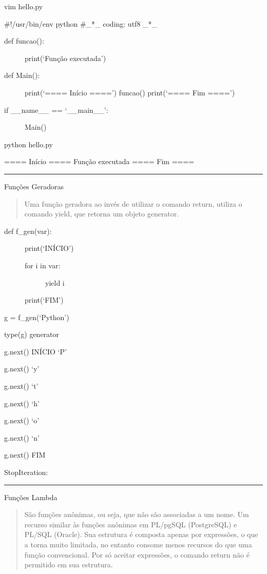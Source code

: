 \documentclass[letterpaper,10pt,brazil]{sphinxmanual}
\begin{document}
vim hello.py

\#!/usr/bin/env python
\#\_*\_ coding: utf\sphinxhyphen{}8 \_*\_
\begin{description}
\item[{def funcao():}] \leavevmode
print(‘Função executada’)

\item[{def Main():}] \leavevmode
print(‘==== Início ====’)
funcao()
print(‘==== Fim ====’)

\item[{if \_\_name\_\_ == ‘\_\_main\_\_’:}] \leavevmode
Main()

\end{description}

python hello.py

==== Início ====
Função executada
==== Fim ====


\bigskip\hrule\bigskip


Funções Geradoras
\begin{quote}

Uma função geradora ao invés de utilizar o comando return, utiliza o comando yield, que retorna um objeto generator.
\end{quote}
\begin{description}
\item[{def f\_gen(var):}] \leavevmode
print(‘INÍCIO’)
\begin{description}
\item[{for i in var:}] \leavevmode
yield i

\end{description}

print(‘FIM’)

\end{description}

g = f\_gen(‘Python’)

type(g)
generator

g.next()
INÍCIO
‘P’

g.next()
‘y’

g.next()
‘t’

g.next()
‘h’

g.next()
‘o’

g.next()
‘n’

g.next()
FIM

StopIteration:


\bigskip\hrule\bigskip


Funções Lambda
\begin{quote}

São funções anônimas, ou seja, que não são associadas a um nome. Um recurso similar às funções anônimas em PL/pgSQL (PostgreSQL) e PL/SQL (Oracle).
Sua estrutura é composta apenas por expressões, o que a torna muito limitada, no entanto consome menos recursos do que uma função convencional.
Por só aceitar expressões, o comando return não é permitido em sua estrutura.
\end{quote}
\end{document}
